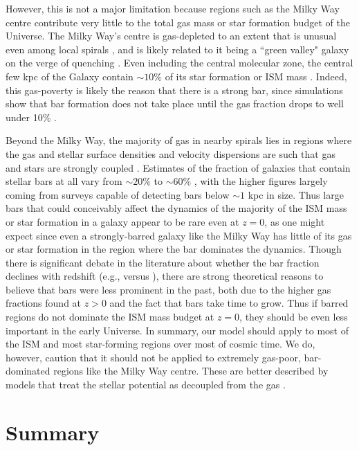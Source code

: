 \documentclass[useAMS,usenatbib]{mn2e}
\begin{document}
However, this is not a major limitation because regions such as the Milky Way centre contribute very little to the total gas mass or star formation budget of the Universe. The Milky Way's centre is gas-depleted to an extent that is unusual even among local spirals \citep{bigiel12a}, and is likely related to it being a ``green valley" galaxy on the verge of quenching \citep{bland-hawthorn16b}. Even including the central molecular zone, the central few kpc of the Galaxy contain $\sim 10\%$ of its star formation or ISM mass \citep[e.g.,][]{kruijssen14b}. Indeed, this gas-poverty is likely the reason that there is a strong bar, since simulations show that bar formation does not take place until the gas fraction drops to well under 10\% \citep{athanassoula13a}. 

Beyond the Milky Way, the majority of gas in nearby spirals lies in regions where the gas and stellar surface densities and velocity dispersions are such that gas and stars are strongly coupled \citep[their Figure 5]{romeo17a}. Estimates of the fraction of galaxies that contain stellar bars at all vary from $\sim 20\%$ \citep[e.g.,][]{melvin14a, cervantes-sodi17a} to $\sim 60\%$ \citep[e.g.,][]{erwin17a}, with the higher figures largely coming from surveys capable of detecting bars below $\sim 1$ kpc in size. Thus large bars that could conceivably affect the dynamics of the majority of the ISM mass or star formation in a galaxy appear to be rare even at $z=0$, as one might expect since even a strongly-barred galaxy like the Milky Way has little of its gas or star formation in the region where the bar dominates the dynamics. Though there is significant debate in the literature about whether the bar fraction declines with redshift (e.g., \citealt{melvin14a} versus \citealt{erwin17a}), there are strong theoretical reasons to believe that bars were less prominent in the past, both due to the higher gas fractions found at $z>0$  \citep[e.g.,][]{tacconi13a} and the fact that bars take time to grow. Thus if barred regions do not dominate the ISM mass budget at $z=0$, they should be even less important in the early Universe. In summary, our model should apply to most of the ISM and most star-forming regions over most of cosmic time. We do, however, caution that it should not be applied to extremely gas-poor, bar-dominated regions like the Milky Way centre. These are better described by models that treat the stellar potential as decoupled from the gas \citep[e.g.,][]{binney91a, sormani15a, krumholz17a}.


\section{Summary}
\label{sec:summary}
\end{document}
